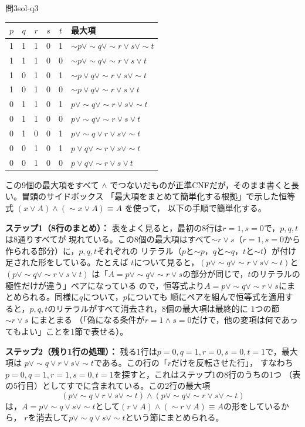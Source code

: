 \documentclass[autodetect-engine,dvi=dvipdfmx,ja=standard]{bxjsarticle}
\begin{document}
\begin{solution}{問3}{sol-q3}
\begin{center}
\scriptsize
\begin{tabular}{ccccc|l}
\toprule
\(p\) & \(q\) & \(r\) & \(s\) & \(t\) & 最大項 \\
\midrule
1&1&1&0&1 & \(\sim p\lor\sim q\lor\sim r\lor s\lor\sim t\) \\
1&1&1&0&0 & \(\sim p\lor\sim q\lor\sim r\lor s\lor t\) \\
1&0&1&0&1 & \(\sim p\lor q\lor\sim r\lor s\lor\sim t\) \\
1&0&1&0&0 & \(\sim p\lor q\lor\sim r\lor s\lor t\) \\
0&1&1&0&1 & \(p\lor\sim q\lor\sim r\lor s\lor\sim t\) \\
0&1&1&0&0 & \(p\lor\sim q\lor\sim r\lor s\lor t\) \\
0&1&0&0&1 & \(p\lor\sim q\lor r\lor s\lor\sim t\) \\
0&0&1&0&1 & \(p\lor q\lor\sim r\lor s\lor\sim t\) \\
0&0&1&0&0 & \(p\lor q\lor\sim r\lor s\lor t\) \\
\bottomrule
\end{tabular}
\end{center}

この9個の最大項をすべて \(\land\) でつないだものが正準CNFだが，そのまま書くと長い。冒頭のサイドボックス
「最大項をまとめて簡単化する根拠」で示した恒等式 \((x\lor A)\land(\sim x\lor A)\equiv A\) を使って，
以下の手順で簡単化する。

\textbf{ステップ1（8行のまとめ）：} 表をよく見ると，最初の8行は\(r=1,s=0\)で，\(p,q,t\)は8通りすべてが
現れている。この8個の最大項はすべて\(\sim r\lor s\)（\(r=1,s=0\)から作られる部分）に，\(p,q,t\)それぞれの
リテラル（\(p\)と\(\sim p\)，\(q\)と\(\sim q\)，\(t\)と\(\sim t\)）が付け足された形をしている。たとえば
\(t\)について見ると，\((p\lor\sim q\lor\sim r\lor s\lor\sim t)\)と\((p\lor\sim q\lor\sim r\lor s\lor t)\)
は「\(A=p\lor\sim q\lor\sim r\lor s\)の部分が同じで，\(t\)のリテラルの極性だけが違う」ペアになっている
ので，恒等式より\(A=p\lor\sim q\lor\sim r\lor s\)にまとめられる。同様に\(q\)について，\(p\)についても
順にペアを組んで恒等式を適用すると，\(p,q,t\)のリテラルがすべて消去され，8個の最大項は最終的に
\(1\)つの節 \(\sim r\lor s\) にまとまる
（「偽になる条件が\(r=1\land s=0\)だけで，他の変項は何であってもよい」ことを1節で表せる）。

\textbf{ステップ2（残り1行の処理）：} 残る1行は\(p=0,q=1,r=0,s=0,t=1\)で，最大項は
\(p\lor\sim q\lor r\lor s\lor\sim t\)である。この行の「\(r\)だけを反転させた行」，
すなわち\(p=0,q=1,r=1,s=0,t=1\)を探すと，これはステップ1の8行のうちの1つ
（表の5行目）としてすでに含まれている。この2行の最大項
\[
  (p\lor\sim q\lor r\lor s\lor\sim t)\land(p\lor\sim q\lor\sim r\lor s\lor\sim t)
\]
は，\(A=p\lor\sim q\lor s\lor\sim t\)として\((r\lor A)\land(\sim r\lor A)\equiv A\)の形をしているから，
\(r\)を消去して\(p\lor\sim q\lor s\lor\sim t\)という節にまとめられる。


\end{solution}
\end{document}
